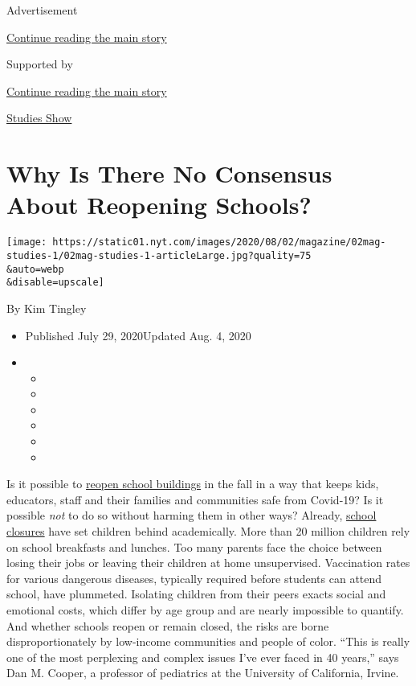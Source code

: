 Advertisement

\protect\hyperlink{after-top}{Continue reading the main story}

Supported by

\protect\hyperlink{after-sponsor}{Continue reading the main story}

\href{/column/studies-show}{Studies Show}

\hypertarget{why-is-there-no-consensus-about-reopening-schools}{%
\section{Why Is There No Consensus About Reopening
Schools?}\label{why-is-there-no-consensus-about-reopening-schools}}

\texttt{[image: https://static01.nyt.com/images/2020/08/02/magazine/02mag-studies-1/02mag-studies-1-articleLarge.jpg?quality=75\\\&auto=webp\\\&disable=upscale]}

By Kim Tingley

\begin{itemize}
\item
  Published July 29, 2020Updated Aug. 4, 2020
\item
  \begin{itemize}
  \item
  \item
  \item
  \item
  \item
  \item
  \end{itemize}
\end{itemize}

Is it possible to
\href{https://www.nytimes.com/2020/08/03/us/school-closing-coronavirus.html}{reopen
school buildings} in the fall in a way that keeps kids, educators, staff
and their families and communities safe from Covid-19? Is it possible
\emph{not} to do so without harming them in other ways? Already,
\href{https://www.nytimes.com/2020/07/29/health/covid-school-reopening.html}{school
closures} have set children behind academically. More than 20 million
children rely on school breakfasts and lunches. Too many parents face
the choice between losing their jobs or leaving their children at home
unsupervised. Vaccination rates for various dangerous diseases,
typically required before students can attend school, have plummeted.
Isolating children from their peers exacts social and emotional costs,
which differ by age group and are nearly impossible to quantify. And
whether schools reopen or remain closed, the risks are borne
disproportionately by low-income communities and people of color. ``This
is really one of the most perplexing and complex issues I've ever faced
in 40 years,'' says Dan M. Cooper, a professor of pediatrics at the
University of California, Irvine.

